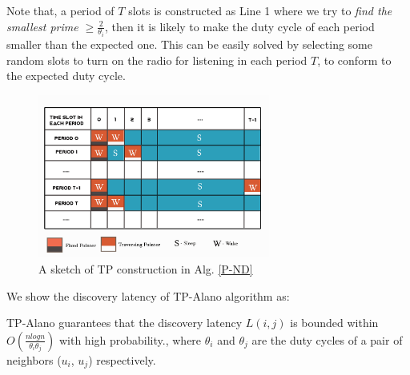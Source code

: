 Note that, a period of $T$ slots is constructed as Line 1 where we try to \emph{find the smallest prime $\geq \frac{2}{\theta_i}$},
then it is likely to make the duty cycle of each period smaller than the expected one. This can be easily solved by selecting some random slots to turn on the radio for listening in each period $T$, to conform to the expected duty cycle.


\begin{figure}[!h]
\centering
\includegraphics[width=3in]{./Figure/TP}
\caption{A sketch of TP construction in Alg. \ref{P-ND}}
\label{TP}
\end{figure}

We show the discovery latency of TP-Alano algorithm as:


\begin{theorem}
\label{PBND1}
TP-Alano guarantees that the discovery latency $L(i,j)$
is bounded within $O(\frac{nlogn}{\theta_i\theta_j})$ with high probability.,
where $\theta_i$ and $\theta_j$ are the duty cycles of
a pair of neighbors ($u_i$, $u_j$) respectively.
\end{theorem}




